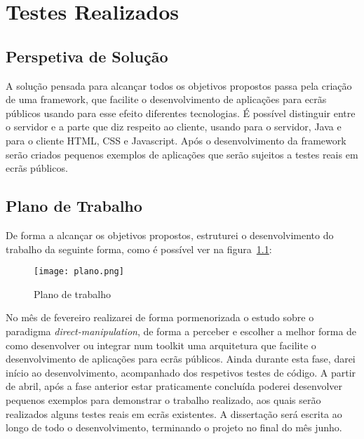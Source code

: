 \chapter{Testes Realizados} \label{chap:concl}

\section*{}

\section{Perspetiva de Solução}

A solução pensada para alcançar todos os objetivos propostos passa pela criação de uma framework, que facilite o desenvolvimento de aplicações para ecrãs públicos usando para esse efeito diferentes tecnologias. É possível distinguir entre o servidor e a parte que diz respeito ao cliente, usando para o servidor, Java e para o cliente HTML, CSS e Javascript.
Após o desenvolvimento da framework serão criados pequenos exemplos de aplicações que serão sujeitos a testes reais em ecrãs públicos.

\section{Plano de Trabalho}

De forma a alcançar os objetivos propostos, estruturei o desenvolvimento do trabalho da seguinte forma, como é possível ver na figura~\ref{fig:plano}:

\begin{figure}[h]
\centering
\texttt{[image: plano.png]}
\caption {Plano de trabalho}
\label{fig:plano}
\end{figure}

No mês de fevereiro realizarei de forma pormenorizada o estudo sobre o paradigma \textit{direct-manipulation}, de forma a perceber e escolher a melhor forma de como desenvolver ou integrar num toolkit uma arquitetura que facilite o desenvolvimento de aplicações para ecrãs públicos. Ainda durante esta fase, darei início ao desenvolvimento, acompanhado dos respetivos testes de código. A partir de abril, após a fase anterior estar praticamente concluída poderei desenvolver pequenos exemplos para demonstrar o trabalho realizado, aos quais serão realizados alguns testes reais em ecrãs existentes.
A dissertação será escrita ao longo de todo o desenvolvimento, terminando o projeto no final do mês junho. 